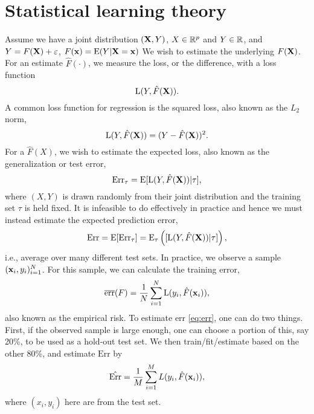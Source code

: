 \chapter{Statistical learning theory}\label{ch:learning-theory}
Assume we have a joint distribution $(\mathbf{X}, Y)$, $X\in\mathbb{R}^p$ and $Y\in\mathbb{R}$, and $Y=F(\mathbf{X})+\varepsilon$, $F(\mathbf{x})=\operatorname{E}(Y|\mathbf{X}=\mathbf{x})$ We wish to estimate the underlying $F(\mathbf{X})$. For an estimate $\hat{F}(\cdot)$, we measure the loss, or the difference, with a loss function
\begin{equation*}
    \operatorname{L}(Y, \hat{F}(\mathbf{X})).
\end{equation*}
A common loss function for regression is the squared loss, also known as the $L_2$ norm,
\begin{equation*}
    \operatorname{L}(Y, \hat{F}(\mathbf{X}))=(Y-\hat{F}(\mathbf{X}))^2.
\end{equation*}
For a $\hat{F}(X)$, we wish to estimate the expected loss, also known as the generalization or test error,
\begin{equation*}
    \text{Err}_{\tau}=\operatorname{E}[\operatorname{L}(Y,\hat{F}(\mathbf{X}))|\tau],
\end{equation*}
where $(X,Y)$ is drawn randomly from their joint distribution and the training set $\tau$ is held fixed. It is infeasible to do effectively in practice  and hence we must instead estimate the expected prediction error,
\begin{equation}\label{eq:err}
    \text{Err}=\operatorname{E}[\text{Err}_\tau]=\operatorname{E}_\tau\left([\operatorname{L}(Y,\hat{F}(\mathbf{X}))|\tau]\right),
\end{equation}
i.e., average over many different test sets.
In practice, we observe a sample $(\mathbf{x}_i,y_i)_{i=1}^N$. For this sample, we can calculate the training error,
\begin{equation}\label{eq:empirical-risk}
    \overline{\text{err}}(F)=\frac{1}{N}\sum_{i=1}^N\operatorname{L}(y_i, \hat{F}(\mathbf{x}_i)),
\end{equation}
also known as the empirical risk. To estimate $\text{err}$ \eqref{eq:err}, one can do two things. First, if the observed sample is large enough, one can choose a portion of this, say 20\%, to be used as a hold-out test set. We then train/fit/estimate based on the other 80\%, and estimate $\text{Err}$ by
\begin{equation*}
    \hat{\text{Err}}=\frac{1}{M}\sum_{i=1}^ML(y_i,\hat{F}(\mathbf{x}_i)),
\end{equation*}
where $(x_i,y_i)$ here are from the test set.